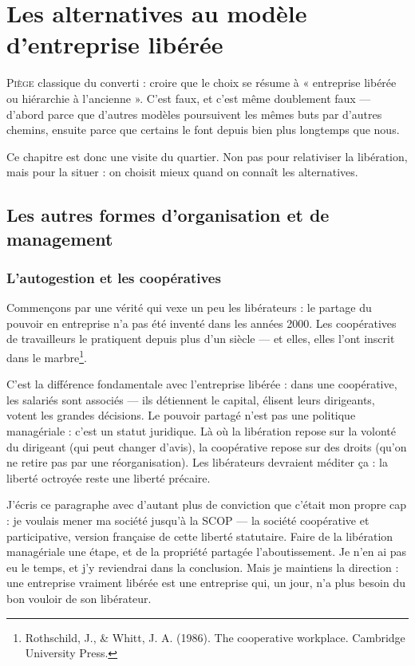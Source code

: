 
\chapter{Les alternatives au modèle d'entreprise libérée}

\lettrine[lines=2]{P}{iège} classique du converti : croire que le choix se résume à « entreprise libérée ou hiérarchie à l'ancienne ». C'est faux, et c'est même doublement faux — d'abord parce que d'autres modèles poursuivent les mêmes buts par d'autres chemins, ensuite parce que certains le font depuis bien plus longtemps que nous.

Ce chapitre est donc une visite du quartier. Non pas pour relativiser la libération, mais pour la situer : on choisit mieux quand on connaît les alternatives.

\section{Les autres formes d'organisation et de management}

\subsection{L'autogestion et les coopératives}

Commençons par une vérité qui vexe un peu les libérateurs : le partage du pouvoir en entreprise n'a pas été inventé dans les années 2000. Les coopératives de travailleurs le pratiquent depuis plus d'un siècle — et elles, elles l'ont inscrit dans le marbre\footnote{Rothschild, J., \& Whitt, J. A. (1986). The cooperative workplace. Cambridge University Press.}.

C'est la différence fondamentale avec l'entreprise libérée : dans une coopérative, les salariés sont associés — ils détiennent le capital, élisent leurs dirigeants, votent les grandes décisions. Le pouvoir partagé n'est pas une politique managériale : c'est un statut juridique. Là où la libération repose sur la volonté du dirigeant (qui peut changer d'avis), la coopérative repose sur des droits (qu'on ne retire pas par une réorganisation). Les libérateurs devraient méditer ça : la liberté octroyée reste une liberté précaire.

J'écris ce paragraphe avec d'autant plus de conviction que c'était mon propre cap : je voulais mener ma société jusqu'à la SCOP — la société coopérative et participative, version française de cette liberté statutaire. Faire de la libération managériale une étape, et de la propriété partagée l'aboutissement. Je n'en ai pas eu le temps, et j'y reviendrai dans la conclusion. Mais je maintiens la direction : une entreprise vraiment libérée est une entreprise qui, un jour, n'a plus besoin du bon vouloir de son libérateur.

